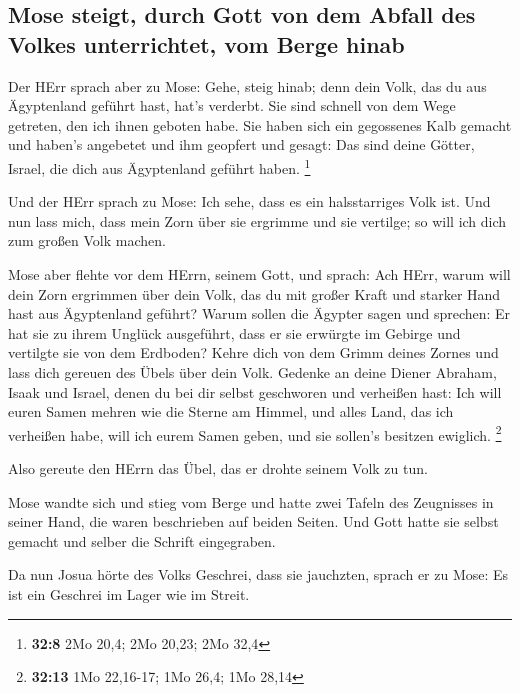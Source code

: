 \hypertarget{mose-steigt-durch-gott-von-dem-abfall-des-volkes-unterrichtet-vom-berge-hinab}{%
\subsection{Mose steigt, durch Gott von dem Abfall des Volkes
unterrichtet, vom Berge
hinab}\label{mose-steigt-durch-gott-von-dem-abfall-des-volkes-unterrichtet-vom-berge-hinab}}

 Der HErr sprach aber zu Mose: Gehe, steig hinab; denn
dein Volk, das du aus Ägyptenland geführt hast, hat's verderbt.
 Sie sind schnell von dem Wege getreten, den ich ihnen
geboten habe. Sie haben sich ein gegossenes Kalb gemacht und haben's
angebetet und ihm geopfert und gesagt: Das sind deine Götter, Israel,
die dich aus Ägyptenland geführt haben. \footnote{\textbf{32:8} 2Mo
  20,4; 2Mo 20,23; 2Mo 32,4}

 Und der HErr sprach zu Mose: Ich sehe, dass es ein
halsstarriges Volk ist.  Und nun lass mich, dass mein
Zorn über sie ergrimme und sie vertilge; so will ich dich zum großen
Volk machen.

 Mose aber flehte vor dem HErrn, seinem Gott, und sprach:
Ach HErr, warum will dein Zorn ergrimmen über dein Volk, das du mit
großer Kraft und starker Hand hast aus Ägyptenland geführt?
 Warum sollen die Ägypter sagen und sprechen: Er hat sie
zu ihrem Unglück ausgeführt, dass er sie erwürgte im Gebirge und
vertilgte sie von dem Erdboden? Kehre dich von dem Grimm deines Zornes
und lass dich gereuen des Übels über dein Volk.  Gedenke
an deine Diener Abraham, Isaak und Israel, denen du bei dir selbst
geschworen und verheißen hast: Ich will euren Samen mehren wie die
Sterne am Himmel, und alles Land, das ich verheißen habe, will ich eurem
Samen geben, und sie sollen's besitzen ewiglich. \footnote{\textbf{32:13}
  1Mo 22,16-17; 1Mo 26,4; 1Mo 28,14}

 Also gereute den HErrn das Übel, das er drohte seinem
Volk zu tun.

 Mose wandte sich und stieg vom Berge und hatte zwei
Tafeln des Zeugnisses in seiner Hand, die waren beschrieben auf beiden
Seiten.  Und Gott hatte sie selbst gemacht und selber die
Schrift eingegraben.

 Da nun Josua hörte des Volks Geschrei, dass sie
jauchzten, sprach er zu Mose: Es ist ein Geschrei im Lager wie im
Streit.

